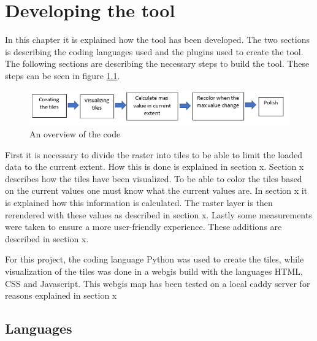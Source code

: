 \chapter{Developing the tool}\label{CDevelopingTool}

In this chapter it is explained how the tool has been developed. The two sections is describing the coding languages used and the plugins used to create the tool. The following sections are describing the necessary steps to build the tool. These steps can be seen in figure \ref{DevelopmentSteps}.


\begin{figure} [H]
	\centering
	\includegraphics[width=1\textwidth]{Pictures/DevelopmentSteps}
	\caption{An overview of the code}
	\label{DevelopmentSteps}
\end{figure}

First it is necessary to divide the raster into tiles to be able to limit the loaded data to the current extent. How this is done is explained in section x. Section x describes how the tiles have been visualized. To be able to color the tiles based on the current values one must know what the current values are. In section x it is explained how this information is calculated. The raster layer is then rerendered with these values as described in section x. Lastly some measurements were taken to ensure a more user-friendly experience. These additions are described in section x. 





For this project, the coding language Python was used to create the tiles, while visualization of the tiles was done in a webgis build with the languages HTML, CSS and Javascript. This webgis map has been tested on a local caddy server for reasons explained in section x

\section{Languages}
